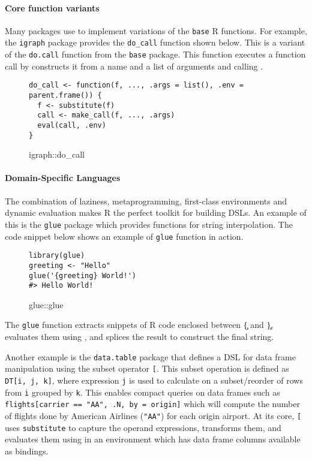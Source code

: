\documentclass[screen,acmsmall]{acmart}%
\newcommand{\code}[1]{\lstinline |#1|\xspace}
\begin{document}
\paragraph{Core function variants} Many packages use \eval to implement variations of the
\code{base} R functions. For example, the \code{igraph} package provides the
\code{do_call} function shown below. This is a variant of the \code{do.call}
function from the \code{base} package. This function executes a function call by
constructs it from a name and a list of arguments and calling \eval.

\begin{figure}[h]
\begin{lstlisting}
do_call <- function(f, ..., .args = list(), .env = parent.frame()) {
  f <- substitute(f)
  call <- make_call(f, ..., .args)
  eval(call, .env)
}
\end{lstlisting}
\caption{igraph::do\_call}
\end{figure}

\paragraph{Domain-Specific Languages} The combination of laziness, metaprogramming,
first-class environments and dynamic evaluation makes R the perfect toolkit for
building DSLs. An example of this is the \code{glue} package which provides
functions for string interpolation. The code snippet below shows an example of
\code{glue} function in action.

\begin{figure}[h]
\begin{lstlisting}
library(glue)
greeting <- "Hello"
glue('{greeting} World!')
#> Hello World!
\end{lstlisting}
  \caption{glue::glue}
\end{figure}

The \code{glue} function extracts snippets of R code enclosed between \c{\{} and
\c{\}}, evaluates them using \eval, and splices the result to construct the
final string.

Another example is the \code{data.table} package that defines a DSL for data
frame manipulation using the subset operator \code{[}. This subset operation is
defined as \code{DT[i, j, k]}, where expression \code{j} is used to calculate on
a subset/reorder of rows from \code{i} grouped by \code{k}. This enables compact
queries on data frames such as \code{flights[carrier == "AA", .N, by = origin]}
which will compute the number of flights done by American Airlines (\code{"AA"})
for each origin airport. At its core, \code{[} uses \code{substitute} to capture
the operand expressions, transforms them, and evaluates them using \eval in an
environment which has data frame columns available as bindings.
\end{document}

